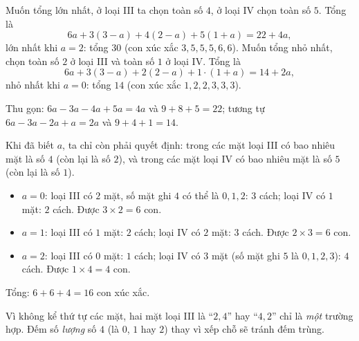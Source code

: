 {
Muốn tổng lớn nhất, ở loại III ta chọn toàn số $4$, ở loại IV chọn toàn số $5$. Tổng là
\[6a+3(3-a)+4(2-a)+5(1+a)=22+4a,\]
lớn nhất khi $a=2$: tổng $30$ (con xúc xắc $3,5,5,5,6,6$).
Muốn tổng nhỏ nhất, chọn toàn số $2$ ở loại III và toàn số $1$ ở loại IV. Tổng là
\[6a+3(3-a)+2(2-a)+1\cdot(1+a)=14+2a,\]
nhỏ nhất khi $a=0$: tổng $14$ (con xúc xắc $1,2,2,3,3,3$).
\begin{recallbox}Thu gọn: $6a-3a-4a+5a=4a$ và $9+8+5=22$; tương tự $6a-3a-2a+a=2a$ và $9+4+1=14$.\end{recallbox}

Khi đã biết $a$, ta chỉ còn phải quyết định: trong các mặt loại III có bao nhiêu mặt là số $4$ (còn lại là số $2$), và trong các mặt loại IV
có bao nhiêu mặt là số $5$ (còn lại là số $1$).
\begin{itemize}[leftmargin=1.2em,itemsep=1pt,topsep=2pt]
\item $a=0$: loại III có $2$ mặt, số mặt ghi $4$ có thể là $0,1,2$: $3$ cách; loại IV có $1$ mặt: $2$ cách. Được $3\times2=6$ con.
\item $a=1$: loại III có $1$ mặt: $2$ cách; loại IV có $2$ mặt: $3$ cách. Được $2\times3=6$ con.
\item $a=2$: loại III có $0$ mặt: $1$ cách; loại IV có $3$ mặt (số mặt ghi $5$ là $0,1,2,3$): $4$ cách. Được $1\times4=4$ con.
\end{itemize}
Tổng: $6+6+4=16$ con xúc xắc.
\begin{warnbox}Vì không kể thứ tự các mặt, hai mặt loại III là ``$2,4$'' hay ``$4,2$'' chỉ là \emph{một} trường hợp. Đếm số
\emph{lượng} số $4$ (là $0$, $1$ hay $2$) thay vì xếp chỗ sẽ tránh đếm trùng.\end{warnbox}
}


